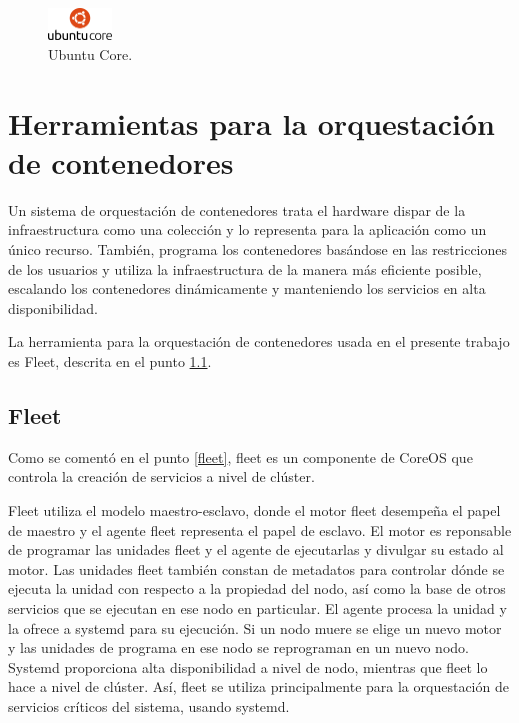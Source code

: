 \begin{figure}[H]
\centering
\includegraphics[width=0.15\textwidth]{images/figures/ubuntucore.jpg}
\caption{Ubuntu Core.\footnotemark}
\end{figure}


\section{Herramientas para la orquestación de contenedores} \label{sec:herramientas}

Un sistema de orquestación de contenedores trata el hardware dispar de la infraestructura como una colección y lo representa para la aplicación como un único recurso. También, programa los contenedores basándose en las restricciones de los usuarios y utiliza la infraestructura de la manera más eficiente posible, escalando los contenedores dinámicamente y manteniendo los servicios en alta disponibilidad.

La herramienta para la orquestación de contenedores usada en el presente trabajo es Fleet, descrita en el punto \hyperref[Fleet]{\ref{Fleet}}.

\subsection{Fleet}\label{Fleet}

Como se comentó en el punto \hyperref[fleet]{\ref{fleet}}, fleet es un componente de CoreOS que controla la creación de servicios a nivel de clúster.

Fleet utiliza el modelo maestro-esclavo, donde el motor fleet desempeña el papel de maestro y el agente fleet representa el papel de esclavo. El motor es reponsable de programar las unidades fleet y el agente de ejecutarlas y divulgar su estado al motor. Las unidades fleet también constan de metadatos para controlar dónde se ejecuta la unidad con respecto a la propiedad del nodo, así como la base de otros servicios que se ejecutan en ese nodo en particular. El agente procesa la unidad y la ofrece a systemd para su ejecución. Si un nodo muere se elige un nuevo motor y las unidades de programa en ese nodo se reprograman en un nuevo nodo. Systemd proporciona alta disponibilidad a nivel de nodo, mientras que fleet lo hace a nivel de clúster. Así, fleet se utiliza principalmente para la orquestación de servicios críticos del sistema, usando systemd.

